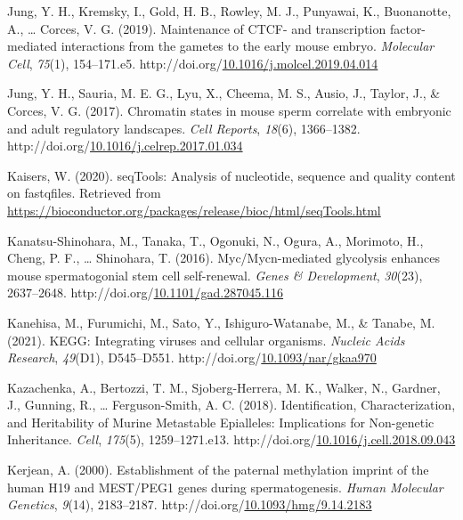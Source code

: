 \documentclass[12pt,twoside]{reedthesis}
\newlength{\cslhangindent}
\newenvironment{CSLReferences}[2] %
 {%
  \setlength{\parindent}{0pt}
  \ifodd #1 \everypar{\setlength{\hangindent}{\cslhangindent}}\ignorespaces\fi
  \ifnum #2 > 0
  \setlength{\parskip}{#2\baselineskip}
  \fi
 }%
 {}
\begin{document}
\begin{CSLReferences}{1}{0}
\leavevmode{}%
Jung, Y. H., Kremsky, I., Gold, H. B., Rowley, M. J., Punyawai, K., Buonanotte, A., \ldots{} Corces, V. G. (2019). Maintenance of CTCF- and transcription factor-mediated interactions from the gametes to the early mouse embryo. \emph{Molecular Cell}, \emph{75}(1), 154--171.e5. http://doi.org/\href{https://doi.org/10.1016/j.molcel.2019.04.014}{10.1016/j.molcel.2019.04.014}

\leavevmode{}%
Jung, Y. H., Sauria, M. E. G., Lyu, X., Cheema, M. S., Ausio, J., Taylor, J., \& Corces, V. G. (2017). Chromatin states in mouse sperm correlate with embryonic and adult regulatory landscapes. \emph{Cell Reports}, \emph{18}(6), 1366--1382. http://doi.org/\href{https://doi.org/10.1016/j.celrep.2017.01.034}{10.1016/j.celrep.2017.01.034}

\leavevmode{}%
Kaisers, W. (2020). seqTools: Analysis of nucleotide, sequence and quality content on fastqfiles. Retrieved from \url{https://bioconductor.org/packages/release/bioc/html/seqTools.html}

\leavevmode{}%
Kanatsu-Shinohara, M., Tanaka, T., Ogonuki, N., Ogura, A., Morimoto, H., Cheng, P. F., \ldots{} Shinohara, T. (2016). Myc/Mycn-mediated glycolysis enhances mouse spermatogonial stem cell self-renewal. \emph{Genes \& Development}, \emph{30}(23), 2637--2648. http://doi.org/\href{https://doi.org/10.1101/gad.287045.116}{10.1101/gad.287045.116}

\leavevmode{}%
Kanehisa, M., Furumichi, M., Sato, Y., Ishiguro-Watanabe, M., \& Tanabe, M. (2021). KEGG: Integrating viruses and cellular organisms. \emph{Nucleic Acids Research}, \emph{49}(D1), D545--D551. http://doi.org/\href{https://doi.org/10.1093/nar/gkaa970}{10.1093/nar/gkaa970}

\leavevmode{}%
Kazachenka, A., Bertozzi, T. M., Sjoberg-Herrera, M. K., Walker, N., Gardner, J., Gunning, R., \ldots{} Ferguson-Smith, A. C. (2018). Identification, Characterization, and Heritability of Murine Metastable Epialleles: Implications for Non-genetic Inheritance. \emph{Cell}, \emph{175}(5), 1259--1271.e13. http://doi.org/\href{https://doi.org/10.1016/j.cell.2018.09.043}{10.1016/j.cell.2018.09.043}

\leavevmode{}%
Kerjean, A. (2000). Establishment of the paternal methylation imprint of the human H19 and MEST/PEG1 genes during spermatogenesis. \emph{Human Molecular Genetics}, \emph{9}(14), 2183--2187. http://doi.org/\href{https://doi.org/10.1093/hmg/9.14.2183}{10.1093/hmg/9.14.2183}


\end{CSLReferences}
\end{document}
